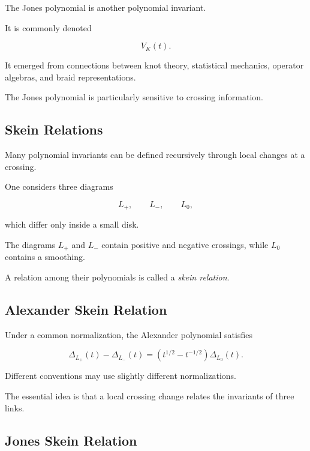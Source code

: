 The Jones polynomial is another polynomial invariant.

It is commonly denoted

\[
\boxed{
V_K(t).
}
\]

It emerged from connections between knot theory, statistical mechanics,
operator algebras, and braid representations.

The Jones polynomial is particularly sensitive to crossing information.

\subsection{Skein Relations}
\label{subsec:skein-relations}

Many polynomial invariants can be defined recursively through local changes
at a crossing.

One considers three diagrams

\[
L_+,
\qquad
L_-,
\qquad
L_0,
\]

which differ only inside a small disk.

The diagrams \(L_+\) and \(L_-\) contain positive and negative crossings,
while \(L_0\) contains a smoothing.

A relation among their polynomials is called a \emph{skein relation}.

\subsection{Alexander Skein Relation}
\label{subsec:alexander-skein-relation}

Under a common normalization, the Alexander polynomial satisfies

\[
\boxed{
\Delta_{L_+}(t)
-
\Delta_{L_-}(t)
=
\left(
t^{1/2}-t^{-1/2}
\right)
\Delta_{L_0}(t).
}
\]

Different conventions may use slightly different normalizations.

The essential idea is that a local crossing change relates the invariants of
three links.

\subsection{Jones Skein Relation}
\label{subsec:jones-skein-relation}

